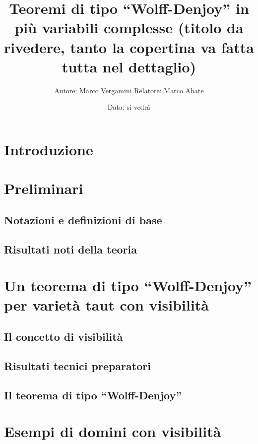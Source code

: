 \documentclass{article}
\title{Teoremi di tipo ``Wolff-Denjoy'' in più variabili complesse (titolo da rivedere, tanto la copertina va fatta tutta nel dettaglio)}
\author{Autore: Marco Vergamini Relatore: Marco Abate}
\date{Data: si vedrà}
\begin{document}
\maketitle
\newpage
\tableofcontents
\newpage


\section*{Introduzione}


\newpage

\section{Preliminari} \label{Preliminari}
\subsection{Notazioni e definizioni di base}

\subsection{Risultati noti della teoria} \label{risnoti}


\newpage

\section{Un teorema di tipo ``Wolff-Denjoy'' per varietà taut con visibilità} \label{Un teorema di tipo ``Wolff-Denjoy'' per varietà taut con visibilità}
\subsection{Il concetto di visibilità}

\subsection{Risultati tecnici preparatori}

\subsection{Il teorema di tipo ``Wolff-Denjoy''}


\newpage

\section{Esempi di domini con visibilità} \label{Esempi di domini con visibilità}

\end{document}
